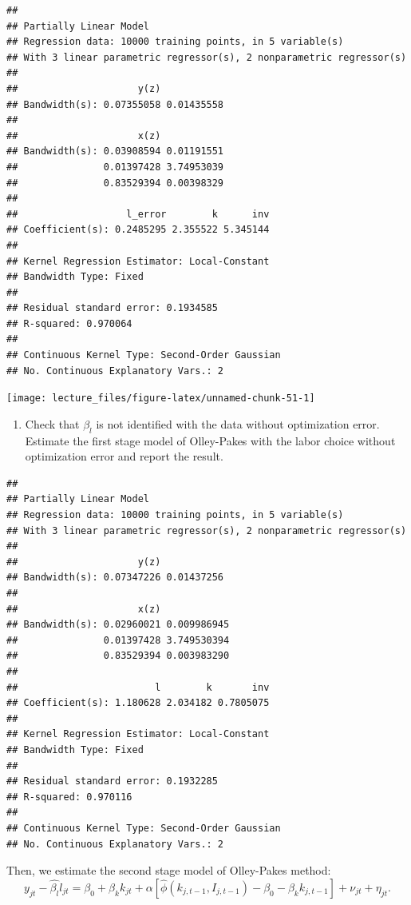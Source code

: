 \documentclass[
]{book}
\providecommand{\tightlist}{%
  \setlength{\itemsep}{0pt}\setlength{\parskip}{0pt}}
\begin{document}
\begin{verbatim}
## 
## Partially Linear Model
## Regression data: 10000 training points, in 5 variable(s)
## With 3 linear parametric regressor(s), 2 nonparametric regressor(s)
## 
##                     y(z)           
## Bandwidth(s): 0.07355058 0.01435558
## 
##                     x(z)           
## Bandwidth(s): 0.03908594 0.01191551
##               0.01397428 3.74953039
##               0.83529394 0.00398329
## 
##                   l_error        k      inv
## Coefficient(s): 0.2485295 2.355522 5.345144
## 
## Kernel Regression Estimator: Local-Constant
## Bandwidth Type: Fixed
## 
## Residual standard error: 0.1934585
## R-squared: 0.970064
## 
## Continuous Kernel Type: Second-Order Gaussian
## No. Continuous Explanatory Vars.: 2
\end{verbatim}

\begin{center}\texttt{[image: lecture\_files/figure-latex/unnamed-chunk-51-1]} \end{center}

\begin{enumerate}
\def\labelenumi{\arabic{enumi}.}
\setcounter{enumi}{3}
\tightlist
\item
  Check that \(\beta_l\) is not identified with the data without optimization error. Estimate the first stage model of Olley-Pakes with the labor choice without optimization error and report the result.
\end{enumerate}

\begin{verbatim}
## 
## Partially Linear Model
## Regression data: 10000 training points, in 5 variable(s)
## With 3 linear parametric regressor(s), 2 nonparametric regressor(s)
## 
##                     y(z)           
## Bandwidth(s): 0.07347226 0.01437256
## 
##                     x(z)            
## Bandwidth(s): 0.02960021 0.009986945
##               0.01397428 3.749530394
##               0.83529394 0.003983290
## 
##                        l        k       inv
## Coefficient(s): 1.180628 2.034182 0.7805075
## 
## Kernel Regression Estimator: Local-Constant
## Bandwidth Type: Fixed
## 
## Residual standard error: 0.1932285
## R-squared: 0.970116
## 
## Continuous Kernel Type: Second-Order Gaussian
## No. Continuous Explanatory Vars.: 2
\end{verbatim}

Then, we estimate the second stage model of Olley-Pakes method:
\[
y_{jt} - \hat{\beta_l} l_{jt} = \beta_0 + \beta_k k_{jt} + \alpha[\hat{\phi}(k_{j, t - 1}, I_{j, t - 1}) - \beta_0 - \beta_k k_{j, t-1}] + \nu_{jt} + \eta_{jt}.
\]
\end{document}
